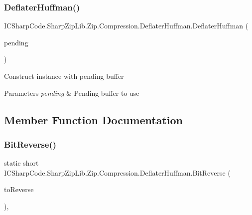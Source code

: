 \subsubsection{\texorpdfstring{Deflater\+Huffman()}{DeflaterHuffman()}\hspace{0.1cm}{\footnotesize\ttfamily [2/2]}}
{\footnotesize\ttfamily I\+C\+Sharp\+Code.\+Sharp\+Zip\+Lib.\+Zip.\+Compression.\+Deflater\+Huffman.\+Deflater\+Huffman (\begin{DoxyParamCaption}\item[{\hyperlink{class_i_c_sharp_code_1_1_sharp_zip_lib_1_1_zip_1_1_compression_1_1_deflater_pending}{Deflater\+Pending}}]{pending }\end{DoxyParamCaption})\hspace{0.3cm}{\ttfamily [inline]}}



Construct instance with pending buffer 


\begin{DoxyParams}{Parameters}
{\em pending} & Pending buffer to use\\
\hline
\end{DoxyParams}


\subsection{Member Function Documentation}
\mbox{\label{class_i_c_sharp_code_1_1_sharp_zip_lib_1_1_zip_1_1_compression_1_1_deflater_huffman_acebc37393bce183e37ca6693f66e8949}} 
\subsubsection{\texorpdfstring{Bit\+Reverse()}{BitReverse()}\hspace{0.1cm}{\footnotesize\ttfamily [1/2]}}
{\footnotesize\ttfamily static short I\+C\+Sharp\+Code.\+Sharp\+Zip\+Lib.\+Zip.\+Compression.\+Deflater\+Huffman.\+Bit\+Reverse (\begin{DoxyParamCaption}\item[{int}]{to\+Reverse }\end{DoxyParamCaption})\hspace{0.3cm}{\ttfamily [inline]}, {\ttfamily [static]}}



